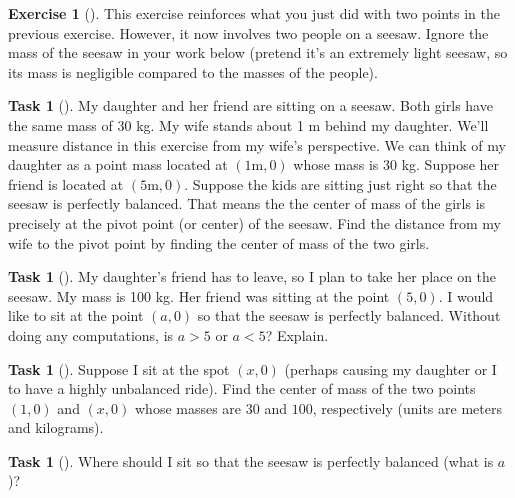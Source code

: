 \documentclass[10pt,]{book}
\theoremstyle{plain}
\theoremstyle{definition}
\theoremstyle{definition}
\theoremstyle{definition}
\theoremstyle{definition}
\newtheorem{exploration}[project]{Exercise}
\newtheorem{task}[project]{Task}
\theoremstyle{definition}
\numberwithin{equation}{section}
\newcommand{\lt}{<}
\begin{document}
\begin{exploration}[]\label{exploration-221}
This exercise reinforces what you just did with two points in the previous exercise. However, it now involves two people on a seesaw. Ignore the mass of the seesaw in your work below (pretend it's an extremely light seesaw, so its mass is negligible compared to the masses of the people).%
\begin{task}[]\label{task-570}
My daughter and her friend are sitting on a seesaw.  Both girls have the same mass of 30 kg. My wife stands about 1 m behind my daughter. We'll measure distance in this exercise from my wife's perspective.  We can think of my daughter as a point mass located at \((1\text{m} ,0)\) whose mass is \(30\) kg. Suppose her friend is located at \((5\text{m} ,0)\). Suppose the kids are sitting just right so that the seesaw is perfectly balanced.  That means the the center of mass of the girls is precisely at the pivot point (or center) of the seesaw. Find the distance from my wife to the pivot point by finding the center of mass of the two girls.%
\end{task}
\begin{task}[]\label{task-571}
My daughter's friend has to leave, so I plan to take her place on the seesaw. My mass is 100 kg. Her friend was sitting at the point \((5,0)\). I would like to sit at the point \((a,0)\) so that the seesaw is perfectly balanced. Without doing any computations, is \(a>5\) or \(a\lt 5\)? Explain.%
\end{task}
\begin{task}[]\label{task-572}
Suppose I sit at the spot \((x,0)\) (perhaps causing my daughter or I to have a highly unbalanced ride). Find the center of mass of the two points \((1,0)\) and \((x,0)\) whose masses are \(30\) and \(100\), respectively (units are meters and kilograms).%
\end{task}
\begin{task}[]\label{task-573}
Where should I sit so that the seesaw is perfectly balanced (what is \(a\))?%
\end{task}
\end{exploration}
\end{document}
